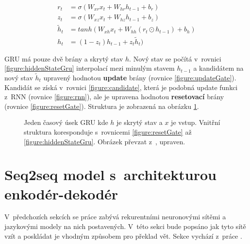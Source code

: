 \begin{align}
    r_{t}&=\sigma(W_{xr}x_{t}+W_{hr}h_{t-1}+b_{r}) \label{figure:resetGate} \\
    z_{t}&=\sigma(W_{xz}x_{t}+W_{hz}h_{t-1}+b_{z}) \label{figure:updateGate} \\
    \tilde{h}_{t}&=tanh(W_{xh}x_t + W_{hh}(r_t \odot h_{t-1}) + b_h) \label{figure:candidate} \\
    h_{t}&=(1 - z_t)h_{t-1} + z_{t}\tilde{h}_{t}) \label{figure:hiddenStateGru}
\end{align}

GRU má pouze dvě brány a skrytý stav $h$. Nový stav se počítá v~rovnici \ref{figure:hiddenStateGru} interpolací mezi minulým stavem $h_{t-1}$ a kandidátem na nový stav $\tilde{h}_{t}$ upravený hodnotou \textbf{update} brány (rovnice \ref{figure:updateGate}). Kandidát se získá v~rovnici \ref{figure:candidate}, která je podobná update funkci z~RNN (rovnice \ref{figure:rnn}), ale je upravena hodnotou \textbf{resetovací} brány (rovnice \ref{figure:resetGate}). Struktura je zobrazená na obrázku \ref{img:GRU}.


\begin{figure}[H]
    \begin{center}
    \end{center}
	\caption{Jeden časový úsek GRU kde $h$ je skrytý stav a $x$ je vstup. Vnitřní struktura koresponduje s~rovnicemi \ref{figure:resetGate} až \ref{figure:hiddenStateGru}. Obrázek převzat z~\cite{understandingLSTM}, upraven.}
	\label{img:GRU}
\end{figure}

\section{Seq2seq model s~architekturou enkodér-dekodér} \label{section:encoderdecoder}
V~předchozích sekcích se práce zabývá rekurentními neuronovými sítěmi a jazykovými modely na nich postavených. V~této sekci bude popsáno jak tyto sítě vzít a poskládat je vhodným způsobem pro překlad vět. Sekce vychází z~práce \cite{nmtTutorial}.

